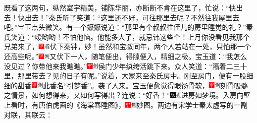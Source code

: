 既看了这两句，纵然室宇精美，铺陈华丽，亦断断不肯在这里了，忙说：“快出去！快出去！”秦氏听了笑道：“这里还不好，可往那里去呢？不然往我屋里去吧。”宝玉点头微笑。有一个嬷嬷说道：“那里有个叔叔往侄儿的房里睡觉的礼？”秦氏笑道：“嗳哟哟！不怕他恼。他能多大了，就忌讳这些个！上月你没看见我那个兄弟来了，{\includegraphics[width=3mm]{../Images/00002}\includegraphics[width=3mm]{../Images/00010}\footnotesize \kaishu 伏下秦钟，妙！}虽然和宝叔同年，两个人若站在一处，只怕那一个还高些呢。”{\includegraphics[width=3mm]{../Images/00002}\includegraphics[width=3mm]{../Images/00011}\footnotesize \kaishu 又伏下一人，随笔便出，得隙便入，精细之极。}宝玉道：“我怎么没见过？你带他来我瞧瞧。”{\includegraphics[width=3mm]{../Images/00002}\includegraphics[width=3mm]{../Images/00011}\footnotesize \kaishu 侯门少年纨绔活跳下来。}众人笑道：“隔着二三十里，那里带去？见的日子有呢。”说着，大家来至秦氏房中。刚至房门，便有一股细细的甜香{\includegraphics[width=3mm]{../Images/00002}\includegraphics[width=3mm]{../Images/00011}\footnotesize \kaishu 此香名“引梦香”。}袭了人来。宝玉便愈觉得眼饧骨软，{\includegraphics[width=3mm]{../Images/00002}\includegraphics[width=3mm]{../Images/00011}\footnotesize \kaishu 刻骨吸髓之情景，如何想得来，又如何写得出？}连说：“好香！”{\includegraphics[width=3mm]{../Images/00009}\includegraphics[width=3mm]{../Images/00012}\footnotesize \kaishu 进房如梦境。}入房向壁上看时，有唐伯虎画的《海棠春睡图》，{\includegraphics[width=3mm]{../Images/00002}\includegraphics[width=3mm]{../Images/00011}\footnotesize \kaishu 妙图。}两边有宋学士秦太虚写的一副对联，其联云：

